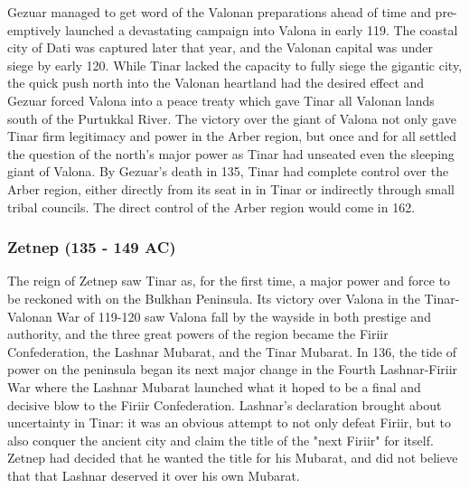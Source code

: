 			Gezuar managed to get word of the Valonan preparations ahead of time and pre-emptively launched a devastating campaign into Valona in early 119. The coastal city of Dati was captured later that year, and the Valonan capital was under siege by early 120. While Tinar lacked the capacity to fully siege the gigantic city, the quick push north into the Valonan heartland had the desired effect and Gezuar forced Valona into a peace treaty which gave Tinar all Valonan lands south of the Purtukkal River. The victory over the giant of Valona not only gave Tinar firm legitimacy and power in the Arber region, but once and for all settled the question of the north's major power as Tinar had unseated even the sleeping giant of Valona. By Gezuar's death in 135, Tinar had complete control over the Arber region, either directly from its seat in in Tinar or indirectly through small tribal councils. The direct control of the Arber region would come in 162.
		\subsubsection{Zetnep (135 - 149 AC)}
			The reign of Zetnep saw Tinar as, for the first time, a major power and force to be reckoned with on the Bulkhan Peninsula. Its victory over Valona in the Tinar-Valonan War of 119-120 saw Valona fall by the wayside in both prestige and authority, and the three great powers of the region became the Firiir Confederation, the Lashnar Mubarat, and the Tinar Mubarat. In 136, the tide of power on the peninsula began its next major change in the Fourth Lashnar-Firiir War where the Lashnar Mubarat launched what it hoped to be a final and decisive blow to the Firiir Confederation. Lashnar's declaration brought about uncertainty in Tinar: it was an obvious attempt to not only defeat Firiir, but to also conquer the ancient city and claim the title of the "next Firiir" for itself. Zetnep had decided that he wanted the title for his Mubarat, and did not believe that that Lashnar deserved it over his own Mubarat.
			
